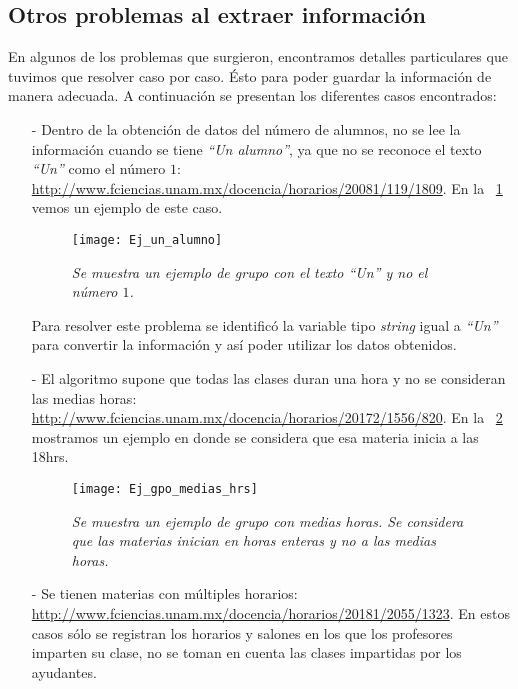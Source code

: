 \subsection{Otros problemas al extraer información}

En algunos de los problemas que surgieron, encontramos detalles particulares que tuvimos que resolver caso por caso. Ésto para poder guardar la información de manera adecuada. A continuación se presentan los diferentes casos encontrados:

\begin{itemize}
\item[-] Dentro de la obtención de datos del número de alumnos, no se lee la información cuando se tiene \textit{``Un alumno''}, ya que no se reconoce el texto \textit{``Un''} como el número $1$: \url{http://www.fciencias.unam.mx/docencia/horarios/20081/119/1809}. En la \figurename{~\ref{UnAlumno}} vemos un ejemplo de este caso.

\begin{figure}[H]
\centering
\texttt{[image: Ej\_un\_alumno]} %
\caption[\textit{Ejemplo de grupo con un alumno}]{\textit{Se muestra un ejemplo de grupo con el texto ``Un'' y no el número $1$.}}\label{UnAlumno}
\end{figure}

Para resolver este problema se identificó la variable tipo \textit{string} igual a \textit{``Un''} para convertir la información y así poder utilizar los datos obtenidos.

\item[-] El algoritmo supone que todas las clases duran una hora y no se consideran las medias horas: \url{http://www.fciencias.unam.mx/docencia/horarios/20172/1556/820}. En la \figurename{~\ref{MediasHoras}} mostramos un ejemplo en donde se considera que esa materia inicia a las 18hrs.

\begin{figure}[H]
\centering
\texttt{[image: Ej\_gpo\_medias\_hrs]} %
\caption[\textit{Ejemplo de grupo con medias horas}]{\textit{Se muestra un ejemplo de grupo con medias horas. Se considera que las materias inician en horas enteras y no a las medias horas.}}\label{MediasHoras}
\end{figure}

\item[-] Se tienen materias con múltiples horarios: \url{http://www.fciencias.unam.mx/docencia/horarios/20181/2055/1323}. En estos casos sólo se registran los horarios y salones en los que los profesores imparten su clase, no se toman en cuenta las clases impartidas por los ayudantes.


\end{itemize}
